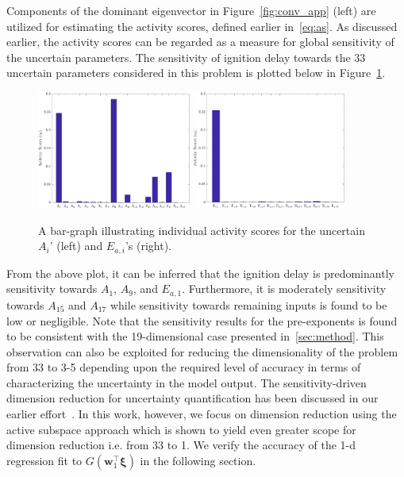 Components of the dominant eigenvector in Figure~\ref{fig:conv_app} (left) are utilized for estimating the
activity scores, defined earlier in~\ref{eq:as}. As discussed earlier, the activity scores can be regarded as a 
measure for global sensitivity of the uncertain parameters. The sensitivity of ignition delay towards the 
33 uncertain parameters considered in this problem is plotted below in Figure~\ref{fig:as_33D}.
%
\begin{figure}[htbp]
 \begin{center}
  \includegraphics[width=0.45\textwidth]{./Figures/as_A_33D}
    \includegraphics[width=0.45\textwidth]{./Figures/as_E_33D}
\caption{A bar-graph illustrating individual activity scores for the uncertain $A_i$' (left) and $E_{a,i}$'s (right).}
\label{fig:as_33D}
\end{center}
\end{figure}
%
From the above plot, it can be inferred that the ignition delay is predominantly sensitivity towards $A_1$, $A_9$, and
$E_{a,1}$. Furthermore, it is moderately sensitivity towards $A_{15}$ and $A_{17}$ while sensitivity towards remaining
inputs is found to be low or negligible. Note that the sensitivity results for the pre-exponents is found to be consistent
with the 19-dimensional case presented in~\ref{sec:method}. This observation can also be exploited for reducing the 
dimensionality of the problem from 33 to 3-5 depending upon the required level of accuracy in terms of characterizing 
the uncertainty in the model output. The sensitivity-driven dimension reduction for uncertainty quantification has been
discussed in our earlier effort~\cite{Vohra:2018}. In this work, however, we focus on dimension reduction using the active 
subspace approach which is shown to yield even greater scope for dimension reduction i.e. from 33 to 1. We verify
the accuracy of the 1-d regression fit to $G(\bm{w}_1^\top\bm{\xi})$ in the following section.

